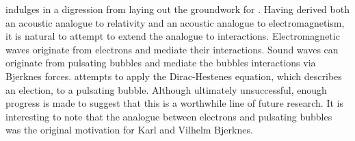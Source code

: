  indulges in a digression from  laying out the groundwork for .
Having derived both an acoustic analogue to relativity 
and an acoustic analogue to electromagnetism,
it is natural to attempt to extend the analogue to interactions.
Electromagnetic waves
originate from electrons
and mediate their interactions.
Sound waves can originate from pulsating bubbles and
mediate the bubbles interactions via Bjerknes forces\cite{Bjerknes1905,Crum1974,Leighton1990,Mettin1997}.
 attempts to apply 
the Dirac-Hestenes equation, which describes an election, 
to a pulsating bubble.
Although ultimately unsuccessful,
enough progress is made to suggest that this is a worthwhile
line of future research.
It is interesting to note that the analogue between electrons and pulsating bubbles
was the original motivation for Karl and Vilhelm Bjerknes\cite{Bjerknes1905}.




 
